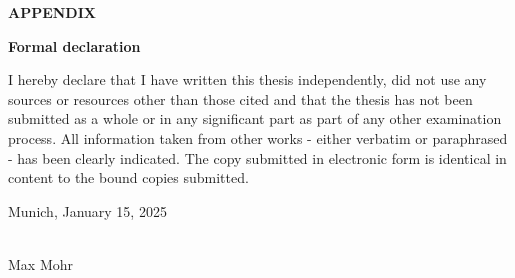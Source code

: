 \documentclass[12pt, a4paper, titlepage]{article}
\begin{document}
\newpage
\thispagestyle{empty}
\begin{center}
  \vspace*{\fill}
  {\Huge\textbf{APPENDIX}}
  \vspace*{\fill}
\end{center}
\newpage
\setcounter{page}{12}


\newpage
{\Large\textbf{Formal declaration}}\\

\par I hereby declare that I have written this thesis independently, did not use any sources or resources other than those cited and that the thesis has not been submitted as a whole or in any significant part as part of any other examination process. All information taken from other works - either verbatim or paraphrased - has been clearly indicated. The copy submitted in electronic form is identical in content to the bound copies submitted.

\vspace{1cm}

Munich, January 15, 2025

\vspace{1cm}
\makebox[5cm]{\hrulefill}\\
Max Mohr
\end{document}
